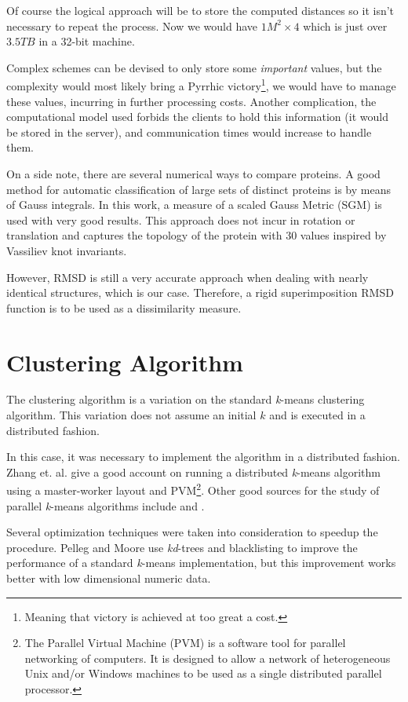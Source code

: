 \documentclass[a4paper,12pt,english]{report}
\begin{document}
Of course the logical approach will be to store the computed distances so it isn't necessary to repeat the process. Now we would have $1M^2 \times 4$ which is just over $3.5TB$ in a 32-bit machine. 

Complex schemes can be devised to only store some \emph{important} values, but the complexity would most likely bring a Pyrrhic victory\footnote{Meaning that victory is achieved at too great a cost.}, we would have to manage these values, incurring in further processing costs. Another complication, the computational model used forbids the clients to hold this information (it would be stored in the server), and communication times would increase to handle them.

On a side note, there are several numerical ways to compare proteins. A good method for automatic classification of large sets of distinct proteins is by means of Gauss integrals\cite{gauss}. In this work, a measure of a scaled Gauss Metric (SGM) is used with very good results. This approach does not incur in rotation or translation and captures the topology of the protein with 30 values inspired by Vassiliev knot invariants.

However, RMSD is still a very accurate approach when dealing with nearly identical structures, which is our case. Therefore, a rigid superimposition RMSD function is to be used as a dissimilarity measure.

\section{Clustering Algorithm}

The clustering algorithm is a variation on the standard \emph{k}-means clustering algorithm. This variation does not assume an initial $k$ and is executed in a distributed fashion. 

In this case, it was necessary to implement the algorithm in a distributed fashion. Zhang et. al. \cite{kmeans} give a good account on running a distributed \emph{k}-means algorithm using a master-worker layout and PVM\footnote{The Parallel Virtual Machine (PVM) is a software tool for parallel networking of computers. It is designed to allow a network of heterogeneous Unix and/or Windows machines to be used as a single distributed parallel processor.}. Other good sources for the study of parallel \emph{k}-means algorithms include \cite{kmeans2} and \cite{kmeans3}.

Several optimization techniques were taken into consideration to speedup the procedure. Pelleg and Moore\cite{kmeans-pm} use \emph{kd}-trees and blacklisting to improve the performance of a standard \emph{k}-means implementation, but this improvement works better with low dimensional numeric data.
\end{document}
